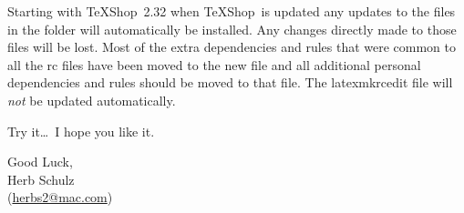 \documentclass[11pt]{article}
\newcommand{\cmd}[1]{\textsf{#1}}
\newcommand{\TS}{\textsf{\TeX Shop}}
\begin{document}
Starting with \TS\ 2.32 when \TS\ is updated any updates to the files in the  folder will automatically be installed. Any changes directly made to those files will be lost. Most of the extra dependencies and rules that were common to all the \cmd{rc} files have been moved to the new  file and all additional personal dependencies and rules should be moved to that file. The \cmd{latexmkrcedit} file will \emph{not} be updated automatically.


\vspace{5pt plus 2pt minus 1pt}\noindent
Try it\dots\ I hope you like it.

\vspace{5pt plus 2pt minus 1pt}\noindent
Good Luck,\\
Herb Schulz\\
(\href{mailto:herbs2@mac.com}{herbs2@mac.com})
\end{document}
